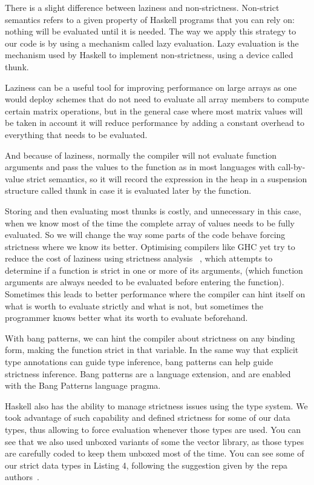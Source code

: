 \documentclass{tmr}
\begin{document}
There is a slight difference between laziness and non-strictness. Non-strict
semantics refers to a given property of Haskell programs that you can rely on: 
nothing will be evaluated until it is needed. The way we apply this strategy to 
our code is by using a mechanism called lazy evaluation. Lazy evaluation is the 
mechanism used by Haskell to implement non-strictness, using a device called thunk. 

Laziness can be a useful tool for improving performance on large arrays as one would deploy
schemes that do not need to evaluate all array members to compute certain matrix operations,
but in the general case where most matrix values will be taken in account it will 
reduce performance by adding a constant overhead to everything that needs to be evaluated.

And because of laziness, normally the compiler will not evaluate function arguments and pass 
the values to the function as in most languages with call-by-value strict semantics, 
so it will record the expression in the heap in a suspension structure called thunk in case it is 
evaluated later by the function. 

Storing and then evaluating most thunks is costly, and unnecessary in this case, when we know 
most of the time the complete array of values needs to be fully evaluated. So we will change the
way some parts of the code behave forcing strictness where we know its better.
Optimising compilers like GHC yet try to reduce the cost of laziness using strictness analysis
 ~\cite{Strictness}, which attempts to determine if a function is strict in one or more of 
its arguments, (which function arguments are always needed to be evaluated before entering the function). 
Sometimes this leads to better performance where the compiler can hint itself on what is worth to evaluate
strictly and what is not, but sometimes the programmer knows better what its worth 
to evaluate beforehand.

With bang patterns, we can hint the compiler about strictness on any binding form, 
making the function strict in that variable. In the same way that explicit type annotations can 
guide type inference, bang patterns can help guide strictness inference. Bang patterns 
are a language extension, and are enabled with the Bang Patterns language pragma.

Haskell also has the ability to manage strictness issues using the type system. We took advantage of such 
capability and defined strictness for some of our data types, thus allowing to force evaluation whenever
 those types are used. You can see that we also used unboxed variants of some the vector library,
as those types are carefully coded to keep them unboxed most of the time. You can see some of our strict data
types in Listing 4, following the suggestion given by the repa authors~\cite{bang}.
\end{document}
